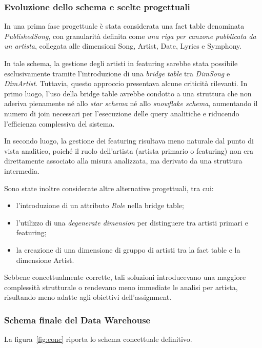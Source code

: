 \subsubsection*{Evoluzione dello schema e scelte progettuali}

In una prima fase progettuale è stata considerata una fact table denominata
\textit{PublishedSong}, con granularità definita come
\emph{una riga per canzone pubblicata da un artista}, collegata alle dimensioni
Song, Artist, Date, Lyrics e Symphony.

In tale schema, la gestione degli artisti in featuring sarebbe stata possibile
esclusivamente tramite l’introduzione di una \textit{bridge table} tra
\textit{DimSong} e \textit{DimArtist}. Tuttavia, questo approccio presentava
alcune criticità rilevanti. In primo luogo, l’uso della bridge table avrebbe
condotto a una struttura che non aderiva pienamente né allo \textit{star schema}
né allo \textit{snowflake schema}, aumentando il numero di join necessari per
l’esecuzione delle query analitiche e riducendo l’efficienza complessiva del
sistema.

In secondo luogo, la gestione dei featuring risultava meno naturale dal punto
di vista analitico, poiché il ruolo dell’artista (artista primario o featuring)
non era direttamente associato alla misura analizzata, ma derivato da una
struttura intermedia.

Sono state inoltre considerate altre alternative progettuali, tra cui:
\begin{itemize}
    \item l’introduzione di un attributo \textit{Role} nella bridge table;
    \item l’utilizzo di una \textit{degenerate dimension} per distinguere tra
    artisti primari e featuring;
    \item la creazione di una dimensione di gruppo di artisti tra la fact table
    e la dimensione Artist.
\end{itemize}

Sebbene concettualmente corrette, tali soluzioni introducevano una maggiore
complessità strutturale o rendevano meno immediate le analisi per artista,
risultando meno adatte agli obiettivi dell’assignment.

\subsubsection*{Schema finale del Data Warehouse}

La figura~\ref{fig:conc} riporta lo schema concettuale definitivo.

